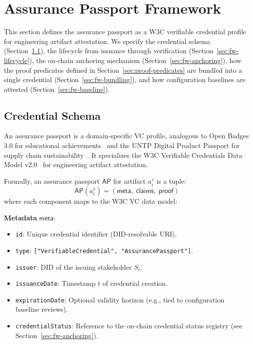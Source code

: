 \section{Assurance Passport Framework}
\label{sec:framework}

This section defines the assurance passport as a W3C verifiable credential profile for engineering artifact attestation.
We specify the credential schema (Section~\ref{sec:fw-schema}), the lifecycle from issuance through verification (Section~\ref{sec:fw-lifecycle}), the on-chain anchoring mechanism (Section~\ref{sec:fw-anchoring}), how the proof predicates defined in Section~\ref{sec:proof-predicates} are bundled into a single credential (Section~\ref{sec:fw-bundling}), and how configuration baselines are attested (Section~\ref{sec:fw-baseline}).

\subsection{Credential Schema}
\label{sec:fw-schema}

An assurance passport is a domain-specific VC profile, analogous to Open Badges 3.0 for educational achievements~\cite{open_badges3} and the UNTP Digital Product Passport for supply chain sustainability~\cite{untp_dpp}.
It specializes the W3C Verifiable Credentials Data Model v2.0~\cite{w3c_vc} for engineering artifact attestation.

Formally, an assurance passport $\mathsf{AP}$ for artifact $a_i^{v}$ is a tuple:
\begin{equation}
\label{eq:ap-tuple}
\mathsf{AP}(a_i^{v}) = \left(\mathsf{meta},\; \mathsf{claims},\; \mathsf{proof}\right)
\end{equation}
where each component maps to the W3C VC data model:

\textbf{Metadata} $\mathsf{meta}$:
\begin{itemize}
    \item \texttt{id}: Unique credential identifier (DID-resolvable URI).
    \item \texttt{type}: \texttt{["VerifiableCredential", "AssurancePassport"]}.
    \item \texttt{issuer}: DID of the issuing stakeholder $S_i$.
    \item \texttt{issuanceDate}: Timestamp $t$ of credential creation.
    \item \texttt{expirationDate}: Optional validity horizon (e.g., tied to configuration baseline reviews).
    \item \texttt{credentialStatus}: Reference to the on-chain credential status registry (see Section~\ref{sec:fw-anchoring}).
\end{itemize}


